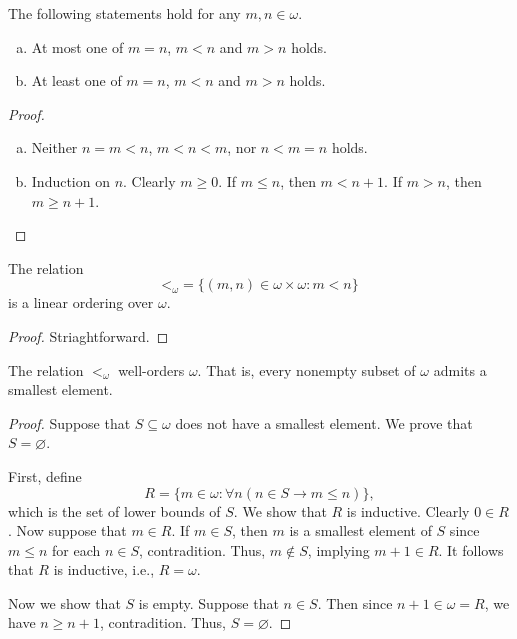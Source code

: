 \documentclass[11pt]{article}
\begin{document}
\begin{theorem}[Trichotomy]
  The following statements hold for any $m, n \in \omega$.
  \begin{enumerate}[(a)]
    \item At most one of $m = n$, $m < n$ and $m > n$ holds.
    \item At least one of $m = n$, $m < n$ and $m > n$ holds.
  \end{enumerate}
\end{theorem}
\begin{proof}
  \leavevmode
  \begin{enumerate}[(a)]
    \item Neither $n = m < n$, $m < n < m$, nor $n < m = n$ holds.
    \item Induction on $n$.
    Clearly $m \geq 0$.
    If $m \leq n$, then $m < n + 1$.
    If $m > n$, then $m \geq n + 1$.
    \qedhere
  \end{enumerate}
\end{proof}

\begin{corollary}
  The relation
  \begin{equation*}
    \mathord{<}_\omega = \{(m, n) \in \omega \times \omega: m < n\}
  \end{equation*}
  is a linear ordering over $\omega$.
\end{corollary}
\begin{proof}
  Striaghtforward.
\end{proof}

\begin{theorem}
  The relation $<_\omega$ well-orders $\omega$.
  That is, every nonempty subset of $\omega$ admits a smallest element.
\end{theorem}
\begin{proof}
  Suppose that $S \subseteq \omega$ does not have a smallest element.
  We prove that $S = \varnothing$.
  \par First, define
  \begin{equation*}
    R = \{m \in \omega: \forall n (n \in S \to m \leq n)\},
  \end{equation*}
  which is the set of lower bounds of $S$.
  We show that $R$ is inductive.
  Clearly $0 \in R$.
  Now suppose that $m \in R$.
  If $m \in S$, then $m$ is a smallest element of $S$ since $m \leq n$ for each $n \in S$, contradition.
  Thus, $m \notin S$, implying $m + 1 \in R$.
  It follows that $R$ is inductive, i.e., $R = \omega$.
  \par Now we show that $S$ is empty.
  Suppose that $n \in S$.
  Then since $n + 1 \in \omega = R$, we have $n \geq n + 1$, contradition.
  Thus, $S = \varnothing$.
\end{proof}
\end{document}

